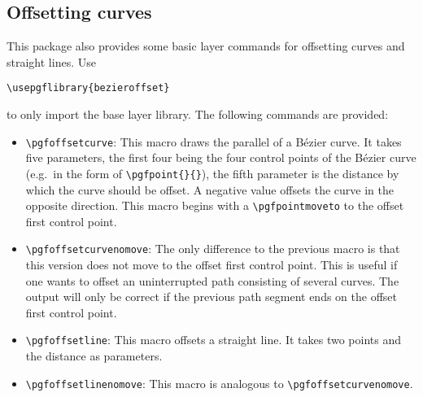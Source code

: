 \documentclass[12pt,a4paper]{article}
\theoremstyle{definition}
\begin{document}
\subsection{Offsetting curves}
This package also provides some basic layer commands for offsetting curves and straight lines. Use
\begin{verbatim}
\usepgflibrary{bezieroffset}
\end{verbatim}
to only import the base layer library. The following commands are provided:
\begin{itemize}
  \item \verb|\pgfoffsetcurve|: This macro draws the parallel of a Bézier curve. It takes five parameters, the first four being the four control points of the Bézier curve (e.g.\ in the form of \verb|\pgfpoint{}{}|), the fifth parameter is the distance by which the curve should be offset. A negative value offsets the curve in the opposite direction. This macro begins with a \verb|\pgfpointmoveto| to the offset first control point.
  \item \verb|\pgfoffsetcurvenomove|: The only difference to the previous macro is that this version does not move to the offset first control point. This is useful if one wants to offset an uninterrupted path consisting of several curves. The output will only be correct if the previous path segment ends on the offset first control point.
  \item \verb|\pgfoffsetline|: This macro offsets a straight line. It takes two points and the distance as parameters.
  \item \verb|\pgfoffsetlinenomove|: This macro is analogous to \verb|\pgfoffsetcurvenomove|.
\end{itemize}
\end{document}
